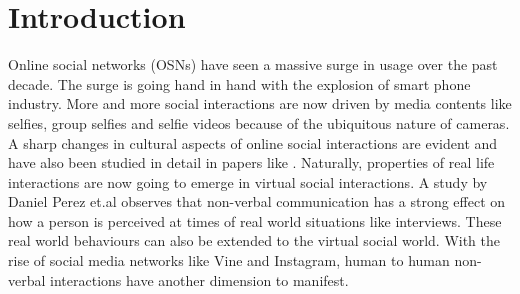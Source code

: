 \section{Introduction}
Online social networks (OSNs) have seen a massive surge in usage over the past decade. The surge is going hand in hand with the explosion of smart phone industry. More and more social interactions are now driven by media contents like selfies, group selfies and selfie videos because of the ubiquitous nature of cameras. A sharp changes in cultural aspects of online social interactions are evident and have also been studied in detail in papers like \cite{Souza2015}. Naturally, properties of real life interactions are now going to emerge in virtual social interactions. A study by Daniel Perez et.al \cite{7175072} observes that non-verbal communication has a strong effect on how a person is perceived at times of real world situations like interviews. These real world behaviours can also be extended to the virtual social world. With the rise of social media networks like Vine and Instagram, human to human non-verbal interactions have another dimension to manifest. 
\par
